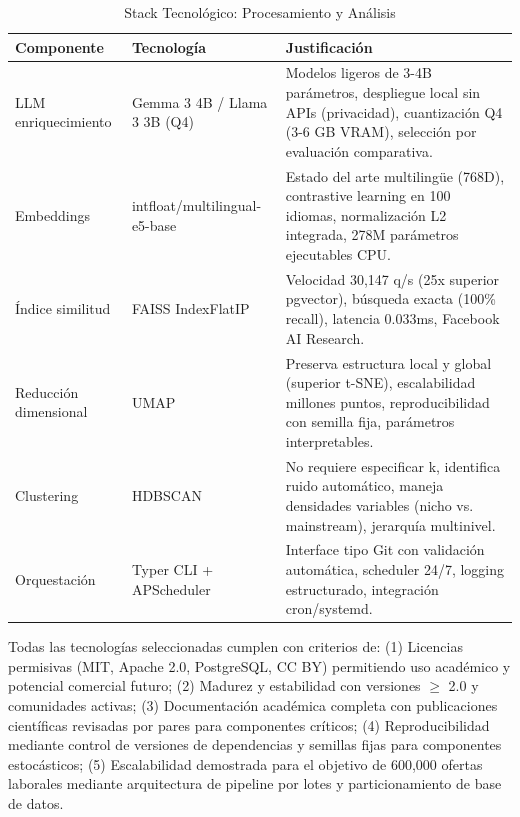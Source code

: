 \begin{table}[H]
\centering
\caption{Stack Tecnológico: Procesamiento y Análisis}
\label{tab:tech-stack-analytics}
\begin{tabular}{|p{3.5cm}|p{3.5cm}|p{6.5cm}|}
\hline
\textbf{Componente} & \textbf{Tecnología} & \textbf{Justificación} \\
\hline
LLM enriquecimiento & Gemma 3 4B / Llama 3 3B (Q4) & Modelos ligeros de 3-4B parámetros, despliegue local sin APIs (privacidad), cuantización Q4 (3-6 GB VRAM), selección por evaluación comparativa. \\
\hline
Embeddings & intfloat/multilingual-e5-base & Estado del arte multilingüe (768D), contrastive learning en 100 idiomas, normalización L2 integrada, 278M parámetros ejecutables CPU. \\
\hline
Índice similitud & FAISS IndexFlatIP & Velocidad 30,147 q/s (25x superior pgvector), búsqueda exacta (100\% recall), latencia 0.033ms, Facebook AI Research. \\
\hline
Reducción dimensional & UMAP \cite{mcinnes2018umap} & Preserva estructura local y global (superior t-SNE), escalabilidad millones puntos, reproducibilidad con semilla fija, parámetros interpretables. \\
\hline
Clustering & HDBSCAN \cite{campello2013} & No requiere especificar k, identifica ruido automático, maneja densidades variables (nicho vs. mainstream), jerarquía multinivel. \\
\hline
Orquestación & Typer CLI + APScheduler & Interface tipo Git con validación automática, scheduler 24/7, logging estructurado, integración cron/systemd. \\
\hline
\end{tabular}
\end{table}

Todas las tecnologías seleccionadas cumplen con criterios de: (1) Licencias permisivas (MIT, Apache 2.0, PostgreSQL, CC BY) permitiendo uso académico y potencial comercial futuro; (2) Madurez y estabilidad con versiones $\geq$ 2.0 y comunidades activas; (3) Documentación académica completa con publicaciones científicas revisadas por pares para componentes críticos; (4) Reproducibilidad mediante control de versiones de dependencias y semillas fijas para componentes estocásticos; (5) Escalabilidad demostrada para el objetivo de 600,000 ofertas laborales mediante arquitectura de pipeline por lotes y particionamiento de base de datos.
